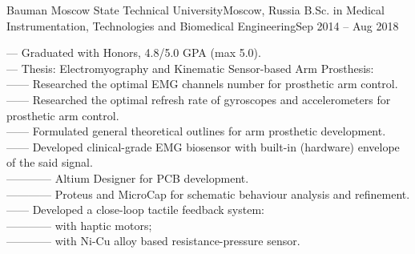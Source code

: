     \resumeSubheading
      {Bauman Moscow State Technical University}{Moscow, Russia}
      {B.Sc. in Medical Instrumentation, Technologies and Biomedical Engineering}{Sep 2014 -- Aug 2018}
      \begin{itemize}[leftmargin=0in, label={}]
            \small{\item{
                {— Graduated with Honors, 4.8/5.0 GPA (max 5.0).}\\
                {— Thesis: Electromyography and Kinematic Sensor-based Arm Prosthesis:}\\
                {—— Researched the optimal EMG channels number for prosthetic arm control.}\\
                {—— Researched the optimal refresh rate of gyroscopes and accelerometers for prosthetic arm control.}\\
                {—— Formulated general theoretical outlines for arm prosthetic development.}\\
                {—— Developed clinical-grade EMG biosensor with built-in (hardware) envelope of the said signal.}\\
                {———— Altium Designer for PCB development.}\\
                {———— Proteus and MicroCap for schematic behaviour analysis and refinement.}\\
                {—— Developed a close-loop tactile feedback system:}\\
                {———— with haptic motors;}\\
                {———— with Ni-Cu alloy based resistance-pressure sensor.}
            }}
      \end{itemize}